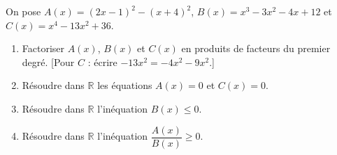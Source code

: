 
On pose $A(x)=(2x-1)^2-(x+4)^2$, $B(x)=x^3-3x^2-4x+12$ et $C(x)=x^4-13x^2+36$.
\begin{enumerate}
  \item Factoriser $A(x)$, $B(x)$ et $C(x)$ en produits de facteurs du premier degré. [Pour $C$ : écrire $-13x^2=-4x^2-9x^2$.]
  \item Résoudre dans $\mathbb R$ les équations $A(x)=0$ et $C(x)=0$.
  \item Résoudre dans $\mathbb R$ l'inéquation $B(x)\leq0$.
  \item Résoudre dans $\mathbb R$ l'inéquation $\dfrac{A(x)}{B(x)}\geq0$.
\end{enumerate}

